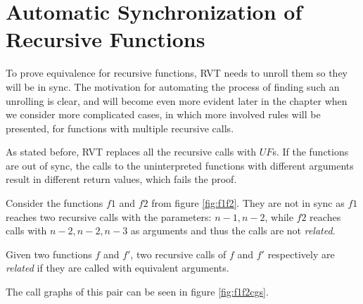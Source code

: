 \section{Automatic Synchronization of Recursive Functions}
To prove equivalence for recursive functions, RVT needs to unroll them so they will be in sync. The motivation for automating the process of finding such an unrolling is clear, and will become even more evident later in the chapter when we consider more complicated cases, in which more involved rules will be presented, for functions with multiple recursive calls. 

As stated before, RVT replaces all the recursive calls with $UF$s. If the functions are out of sync, the calls to the uninterpreted functions with different arguments result in different return values, which fails the proof.

Consider the functions $f1$ and $f2$ from figure \ref{fig:f1f2}.
They are not in sync as $f1$ reaches two recursive calls with the parameters: $n-1,n-2$, while $f2$ reaches calls with $n-2,n-2,n-3$ as arguments and thus the calls are not \emph{related}.
\begin{definition}
\label{def:relatedcalls}
Given two functions $f$ and $f'$, two recursive calls of $f$ and $f'$ respectively are \emph{related}  if they are called with equivalent arguments.  
\end{definition}
The call graphs of this pair can be seen in figure \ref{fig:f1f2cgs}.

